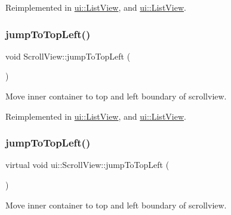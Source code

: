 Reimplemented in \hyperlink{classui_1_1ListView_ac816b897b329ca67365e8e3f31a5bf18}{ui\+::\+List\+View}, and \hyperlink{classui_1_1ListView_af3477294f3fc87bbc9aaa1bec3c86fd8}{ui\+::\+List\+View}.

\mbox{\label{classui_1_1ScrollView_ac61119b9f40bf3a81e3a71e3d84c0c90}} 
\subsubsection{\texorpdfstring{jump\+To\+Top\+Left()}{jumpToTopLeft()}\hspace{0.1cm}{\footnotesize\ttfamily [1/2]}}
{\footnotesize\ttfamily void Scroll\+View\+::jump\+To\+Top\+Left (\begin{DoxyParamCaption}{ }\end{DoxyParamCaption})\hspace{0.3cm}{\ttfamily [virtual]}}

Move inner container to top and left boundary of scrollview. 

Reimplemented in \hyperlink{classui_1_1ListView_a16fed680b5ef2a65ae0e3a1540e9727e}{ui\+::\+List\+View}, and \hyperlink{classui_1_1ListView_a18c1e20a9c26bffa2ff05156673d4ce9}{ui\+::\+List\+View}.

\mbox{\label{classui_1_1ScrollView_ab69e73837690c7891ea0bfb88d28256e}} 
\subsubsection{\texorpdfstring{jump\+To\+Top\+Left()}{jumpToTopLeft()}\hspace{0.1cm}{\footnotesize\ttfamily [2/2]}}
{\footnotesize\ttfamily virtual void ui\+::\+Scroll\+View\+::jump\+To\+Top\+Left (\begin{DoxyParamCaption}{ }\end{DoxyParamCaption})\hspace{0.3cm}{\ttfamily [virtual]}}

Move inner container to top and left boundary of scrollview. 

